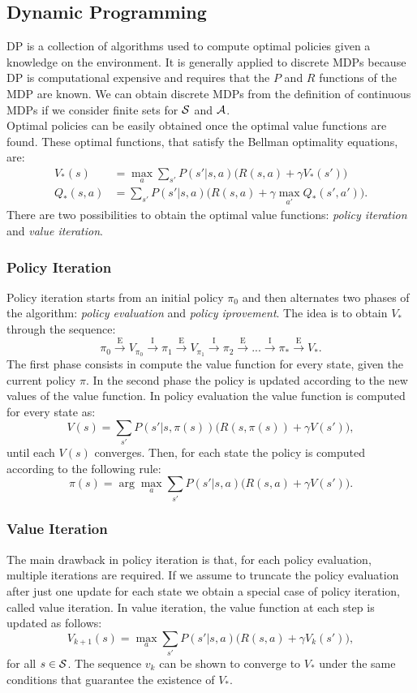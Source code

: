 \subsection{Dynamic Programming}
\acf{DP} is a collection of algorithms used to compute optimal policies given a knowledge on the environment. It is generally applied to discrete \ac{MDP}s because \ac{DP} is computational expensive and requires that the $P$ and $R$ functions of the \ac{MDP} are known. We can obtain discrete \ac{MDP}s from the definition of continuous \ac{MDP}s if we consider finite sets for $\mathcal{S}$ and $\mathcal{A}$.\\
\newline
Optimal policies can be easily obtained once the optimal value functions are found. These optimal functions, that satisfy the Bellman optimality equations, are:
\begin{align*}
	V_{*}(s) &= \max_a \sum_{s'}P(s'|s,a) \Big( R(s,a) + \gamma V_{*}(s') \Big)\\
	Q_{*}(s,a) &= \sum_{s'}P(s'|s,a) \Big( R(s,a) + \gamma \max_{a'} Q_{*}(s', a') \Big).
\end{align*}
There are two possibilities to obtain the optimal value functions: \emph{policy iteration} and \emph{value iteration}.

\subsubsection{Policy Iteration}
Policy iteration starts from an initial policy $\pi_0$ and then alternates two phases of the algorithm: \emph{policy evaluation} and \emph{policy iprovement}. The idea is to obtain $V_{*}$ through the sequence:
$$ \pi_{0} \xrightarrow{\text{E}} V_{\pi_{0}} \xrightarrow{\text{I}} \pi_{1} \xrightarrow{\text{E}} V_{\pi_{1}} \xrightarrow{\text{I}} \pi_{2} \xrightarrow{\text{E}} ... \xrightarrow{\text{I}} \pi_{*} \xrightarrow{\text{E}} V_{*}.
$$
The first phase consists in compute the value function for every state, given the current policy $\pi$. In the second phase the policy is updated according to the new values of the value function.
In policy evaluation the value function is computed for every state as:
$$
V(s) = \sum_{s'}P(s'|s,\pi(s)) \Big( R(s,\pi(s)) + \gamma V(s') \Big),
$$
until each $V(s)$ converges. Then, for each state the policy is computed according to the following rule:
$$ \pi(s) = \arg \max_{a} \sum_{s'} P(s'|s,a) \Big( R(s,a) + \gamma V(s') \Big).$$
\subsubsection{Value Iteration}
The main drawback in policy iteration is that, for each policy evaluation, multiple iterations are required. If we assume to truncate the policy evaluation after just one update for each state we obtain a special case of policy iteration, called value iteration. In value iteration, the value function at each step is updated as follows:
$$ V_{k+1}(s) = \max_a \sum_{s'}P(s'|s,a) \Big( R(s,a) + \gamma V_{k}(s') \Big),
$$
for all $s \in \mathcal{S}$. The sequence ${v_{k}}$ can be shown to converge to $V_{*}$ under the same conditions that guarantee the existence of $V_{*}$.
